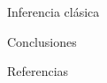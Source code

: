 \documentclass[aspectratio=169,10pt]{beamer}
\newcommand{\tabla}[1]{}
\newcommand{\tablaancha}[1]{\resizebox{\textwidth}{!}{\tabla{#1}}}
\begin{document}
\begin{frame}{Inferencia clásica}
  \centering
  \tablaancha{resumen_pruebas}
\end{frame}

\begin{frame}{Conclusiones}
\end{frame}

\begin{frame}[allowframebreaks]{Referencias}
  \nocite{*}
  \printbibliography[heading=none]
\end{frame}
\end{document}
